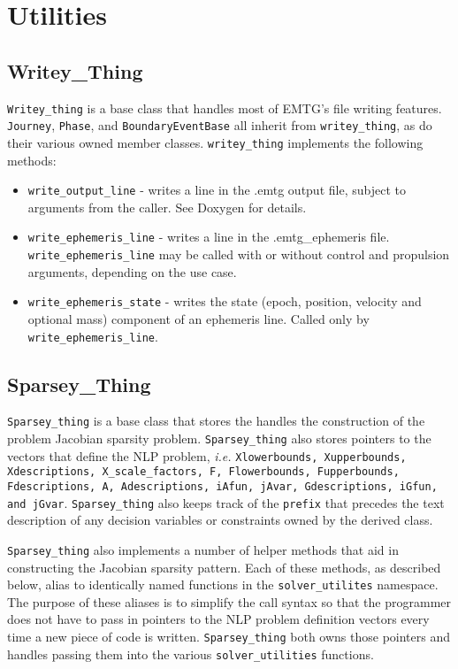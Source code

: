 \chapter{Utilities}
\label{chap:utilities}

\section{Writey\_Thing}
\label{sec:writey_thing}

\texttt{Writey\_thing} is a base class that handles most of EMTG's file writing features. \texttt{Journey}, \texttt{Phase}, and \texttt{BoundaryEventBase} all inherit from \texttt{writey\_thing}, as do their various owned member classes. \texttt{writey\_thing} implements the following methods:

\begin{itemize}
	\item \texttt{write\_output\_line} - writes a line in the .emtg output file, subject to arguments from the caller. See Doxygen for details.
	\item \texttt{write\_ephemeris\_line} - writes a line in the .emtg\_ephemeris file. \texttt{write\_ephemeris\_line} may be called with or without control and propulsion arguments, depending on the use case.
	\item \texttt{write\_ephemeris\_state} - writes the state (epoch, position, velocity and optional mass) component of an ephemeris line. Called only by \texttt{write\_ephemeris\_line}.
\end{itemize}

\section{Sparsey\_Thing}
\label{sec:sparsey_thing}

\texttt{Sparsey\_thing} is a base class that stores the handles the construction of the problem Jacobian sparsity problem. \texttt{Sparsey\_thing} also stores pointers to the vectors that define the NLP problem, \textit{i.e.} \texttt{Xlowerbounds, Xupperbounds, Xdescriptions, X\_scale\_factors, F, Flowerbounds, Fupperbounds, Fdescriptions, A, Adescriptions, iAfun, jAvar, Gdescriptions, iGfun, and jGvar}. \texttt{Sparsey\_thing} also keeps track of the \texttt{prefix} that precedes the text description of any decision variables or constraints owned by the derived class.

\texttt{Sparsey\_thing} also implements a number of helper methods that aid in constructing the Jacobian sparsity pattern. Each of these methods, as described below, alias to identically named functions in the \texttt{solver\_utilites} namespace. The purpose of these aliases is to simplify the call syntax so that the programmer does not have to pass in pointers to the NLP problem definition vectors every time a new piece of code is written. \texttt{Sparsey\_thing} both owns those pointers and handles passing them into the various \texttt{solver\_utilities} functions.

